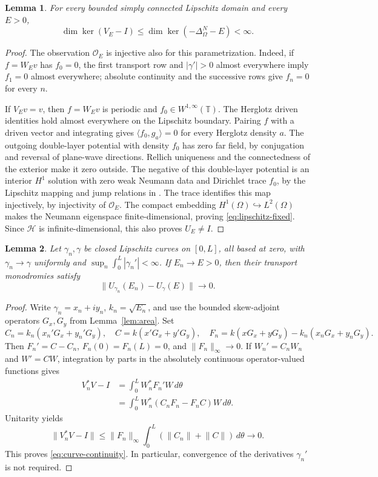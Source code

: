 \documentclass[11pt]{amsart}
\numberwithin{equation}{section}
\newtheorem{lemma}{Lemma}[section]
\newcommand{\HH}{\mathscr H}
\newcommand{\T}{\mathbb T}
\newcommand{\OO}{\mathcal O}
\newcommand{\ip}[2]{\langle #1,#2\rangle}
\newcommand{\norm}[1]{\lVert #1\rVert}
\begin{document}
\begin{lemma}\label{lem:lipschitz-fixed}
For every bounded simply connected Lipschitz domain and every $E>0$,
\begin{equation}\label{eq:lipschitz-fixed}
 \dim\ker(V_E-I)\le\dim\ker(-\Delta_\Omega^N-E)<\infty.
\end{equation}
\end{lemma}
\begin{proof}
The observation $\OO_E$ is injective also for this parametrization.
Indeed, if $f=W_Ev$ has $f_0=0$, the first transport row and
$|\gamma'|>0$ almost everywhere imply $f_1=0$ almost everywhere;
absolute continuity and the successive rows give $f_n=0$ for every $n$.

If $V_Ev=v$, then $f=W_Ev$ is periodic and $f_0\in W^{1,\infty}(\T)$.
The Herglotz driven identities hold almost everywhere on the Lipschitz
boundary. Pairing $f$ with a driven vector and integrating gives
$\ip{f_0}{g_a}=0$ for every Herglotz density $a$.
The outgoing double-layer potential with density $f_0$ has zero far
field, by conjugation and reversal of plane-wave directions. Rellich
uniqueness and the connectedness of the exterior make it zero outside.
The negative of this double-layer potential is an interior $H^1$
solution with zero weak Neumann data and Dirichlet trace $f_0$, by
the Lipschitz mapping and jump relations in \cite{McLean}.
The trace identifies this map injectively, by injectivity of $\OO_E$.
The compact embedding $H^1(\Omega)\hookrightarrow L^2(\Omega)$ makes
the Neumann eigenspace finite-dimensional, proving
\eqref{eq:lipschitz-fixed}. Since $\HH$ is infinite-dimensional,
this also proves $U_E\ne I$.
\end{proof}

\begin{lemma}\label{lem:curve-continuity}
Let $\gamma_n,\gamma$ be closed Lipschitz curves on $[0,L]$, all based
at zero, with $\gamma_n\to\gamma$ uniformly and
$\sup_n\int_0^L|\gamma_n'|<\infty$. If $E_n\to E>0$, then their
transport monodromies satisfy
\begin{equation}\label{eq:curve-continuity}
 \norm{U_{\gamma_n}(E_n)-U_\gamma(E)}\longrightarrow0.
\end{equation}
\end{lemma}
\begin{proof}
Write $\gamma_n=x_n+iy_n$, $k_n=\sqrt{E_n}$, and use the bounded
skew-adjoint operators $G_x,G_y$ from Lemma~\ref{lem:area}. Set
\[
 C_n=k_n(x_n'G_x+y_n'G_y),\quad C=k(x'G_x+y'G_y),\quad
 F_n=k(xG_x+yG_y)-k_n(x_nG_x+y_nG_y).
\]
Then $F_n'=C-C_n$, $F_n(0)=F_n(L)=0$, and
$\norm{F_n}_\infty\to0$. If $W_n'=C_nW_n$ and $W'=CW$, integration
by parts in the absolutely continuous operator-valued functions gives
\begin{align*}
 V_n^*V-I
 &=\int_0^L W_n^*F_n'W\,d\theta\\
 &=\int_0^L W_n^*(C_nF_n-F_nC)W\,d\theta.
\end{align*}
Unitarity yields
\[
 \norm{V_n^*V-I}\le\norm{F_n}_\infty
    \int_0^L(\norm{C_n}+\norm C)\,d\theta\longrightarrow0.
\]
This proves \eqref{eq:curve-continuity}. In particular, convergence
of the derivatives $\gamma_n'$ is not required.
\end{proof}
\end{document}
